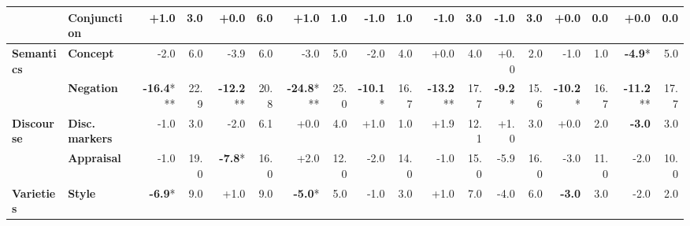 \begin{table}[h]
{\begin{tabular}{llrrrrrrrrrrrrrrrr}
  & \textbf{Conjunction} & \cellcolor{green!1} +1.0 & \cellcolor{blue!2} 3.0 & \cellcolor{red!0} +0.0 & \cellcolor{blue!4} 6.0 & \cellcolor{green!1} +1.0 & \cellcolor{blue!0} 1.0 & \cellcolor{red!1} -1.0 & \cellcolor{blue!0} 1.0 & \cellcolor{red!1} -1.0 & \cellcolor{blue!2} 3.0 & \cellcolor{red!1} -1.0 & \cellcolor{blue!2} 3.0 & \cellcolor{red!0} +0.0 & \cellcolor{blue!0} 0.0 & \cellcolor{red!0} +0.0 & \cellcolor{blue!0} 0.0 \\
\midrule
\textbf{Semantics} & \textbf{Concept} & \cellcolor{red!3} -2.0 & \cellcolor{blue!4} 6.0 & \cellcolor{red!7} -3.9 & \cellcolor{blue!4} 6.0 & \cellcolor{red!5} -3.0 & \cellcolor{blue!4} 5.0 & \cellcolor{red!3} -2.0 & \cellcolor{blue!3} 4.0 & \cellcolor{red!0} +0.0 & \cellcolor{blue!3} 4.0 & \cellcolor{red!0} +0.0 & \cellcolor{blue!1} 2.0 & \cellcolor{red!1} -1.0 & \cellcolor{blue!0} 1.0 & \cellcolor{red!9} \textbf{-4.9}* & \cellcolor{blue!4} 5.0 \\
  & \textbf{Negation} & \cellcolor{red!20} \textbf{-16.4}*** & \cellcolor{blue!18} 22.9 & \cellcolor{red!20} \textbf{-12.2}** & \cellcolor{blue!16} 20.8 & \cellcolor{red!20} \textbf{-24.8}*** & \cellcolor{blue!20} 25.0 & \cellcolor{red!20} \textbf{-10.1}* & \cellcolor{blue!13} 16.7 & \cellcolor{red!20} \textbf{-13.2}** & \cellcolor{blue!14} 17.7 & \cellcolor{red!18} \textbf{-9.2}* & \cellcolor{blue!12} 15.6 & \cellcolor{red!20} \textbf{-10.2}* & \cellcolor{blue!13} 16.7 & \cellcolor{red!20} \textbf{-11.2}** & \cellcolor{blue!14} 17.7 \\
\midrule
\textbf{Discourse} & \textbf{Disc. markers} & \cellcolor{red!1} -1.0 & \cellcolor{blue!2} 3.0 & \cellcolor{red!3} -2.0 & \cellcolor{blue!4} 6.1 & \cellcolor{red!0} +0.0 & \cellcolor{blue!3} 4.0 & \cellcolor{green!1} +1.0 & \cellcolor{blue!0} 1.0 & \cellcolor{green!3} +1.9 & \cellcolor{blue!9} 12.1 & \cellcolor{green!1} +1.0 & \cellcolor{blue!2} 3.0 & \cellcolor{red!0} +0.0 & \cellcolor{blue!1} 2.0 & \cellcolor{red!5} \textbf{-3.0} & \cellcolor{blue!2} 3.0 \\
  & \textbf{Appraisal} & \cellcolor{red!1} -1.0 & \cellcolor{blue!15} 19.0 & \cellcolor{red!15} \textbf{-7.8}* & \cellcolor{blue!12} 16.0 & \cellcolor{green!3} +2.0 & \cellcolor{blue!9} 12.0 & \cellcolor{red!3} -2.0 & \cellcolor{blue!11} 14.0 & \cellcolor{red!1} -1.0 & \cellcolor{blue!12} 15.0 & \cellcolor{red!11} -5.9 & \cellcolor{blue!12} 16.0 & \cellcolor{red!5} -3.0 & \cellcolor{blue!8} 11.0 & \cellcolor{red!3} -2.0 & \cellcolor{blue!8} 10.0 \\
\midrule
\textbf{Varieties} & \textbf{Style} & \cellcolor{red!13} \textbf{-6.9}* & \cellcolor{blue!7} 9.0 & \cellcolor{green!1} +1.0 & \cellcolor{blue!7} 9.0 & \cellcolor{red!9} \textbf{-5.0}* & \cellcolor{blue!4} 5.0 & \cellcolor{red!1} -1.0 & \cellcolor{blue!2} 3.0 & \cellcolor{green!1} +1.0 & \cellcolor{blue!5} 7.0 & \cellcolor{red!7} -4.0 & \cellcolor{blue!4} 6.0 & \cellcolor{red!5} \textbf{-3.0} & \cellcolor{blue!2} 3.0 & \cellcolor{red!3} -2.0 & \cellcolor{blue!1} 2.0 \\

\end{tabular}}
\end{table}
